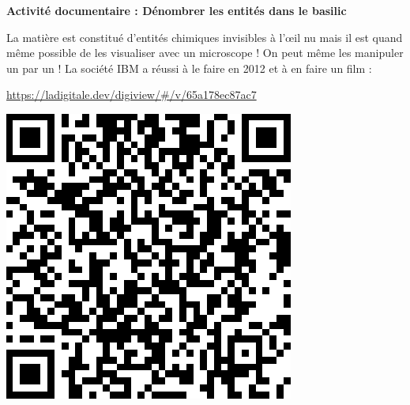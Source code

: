 \modeCorrection

\renewcommand{\thesubsection}{\textcolor{red}{\Roman{section}.\arabic{subsection}}}
\renewcommand{\thesubsubsection}{\textcolor{red}{\Roman{section}.\arabic{subsection}.\alph{subsubsection}}}

\setcounter{section}{0}
\setcounter{document}{0}

\begin{center}
\begin{mdframed}[style=titr, leftmargin=60pt, rightmargin=60pt, innertopmargin=7pt, innerbottommargin=7pt, innerrightmargin=8pt, innerleftmargin=8pt]

\begin{center}
\large{\textbf{Activité documentaire : Dénombrer les entités dans le basilic}}
\end{center}

\end{mdframed}
\end{center}

\begin{tcolorbox}[colback=orange!5!white,colframe=orange!75!black,title= Contexte de l'activité]
\begin{minipage}{0.7\textwidth}
    La matière est constitué d'entités chimiques invisibles à l'\oe il nu mais il est quand même possible de les visualiser avec un microscope ! On peut même les manipuler un par un ! La société IBM a réussi à le faire en 2012 et à en faire un film :
    \begin{center}
        \url{https://ladigitale.dev/digiview/#/v/65a178ec87ac7}
    \end{center}

\end{minipage}
\begin{minipage}{0.25\textwidth}
    \begin{center}
        \includegraphics[scale=0.3]{Images/Qrcode_IBM.png}
    \end{center}
\end{minipage}
\vspace{1cm}
\end{tcolorbox}

